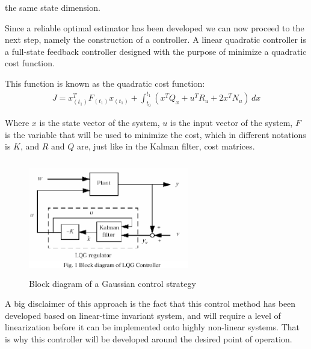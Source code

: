 \documentclass[conference]{IEEEtran}
\begin{document}
the same state dimension.
\par
Since a reliable optimal estimator has been developed we can now proceed to the
next step, namely the construction of a controller. A linear quadratic controller
is a full-state feedback controller designed with the purpose of minimize a quadratic cost function.
\par
This function is known as the quadratic cost function:
\begin{align}
    J=x^T_{(t_1)}F_{(t_1)}x_{(t_1)}+\int_{t_0}^{t_1} {(x^{T}Q_{x}+u^{T}R_{u}+2x^{T}N_{u})} \,dx
\end{align}
\par
Where $x$ is the state vector of the system, $u$ is the input vector of the system,
$F$ is the variable that will be used to minimize the cost, which in different
notations is $K$, and $R$ and $Q$ are, just like in the Kalman filter, cost matrices.
\par
\begin{figure}
    \centering
    \includegraphics[width=70mm,height=50mm]{GAUSS.png}
    \caption[]{Block diagram of a Gaussian control strategy}\label{Gauss}
\end{figure}
\par
A big disclaimer of this approach is the fact that this control method
has been developed based on linear-time invariant system, and will require a level of linearization before it can be implemented onto highly non-linear systems. That is why this controller will be developed around the desired point of operation.
\end{document}
